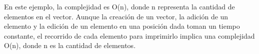 \documentclass{article}
\begin{document}
En este ejemplo, la complejidad es O(n), donde n representa la cantidad de elementos en el vector. Aunque la creación de un vector, la adición de un elemento y la edición de un elemento en una posición dada toman un tiempo constante, el recorrido de cada elemento para imprimirlo implica una complejidad O(n), donde n es la cantidad de elementos.
\end{document}
